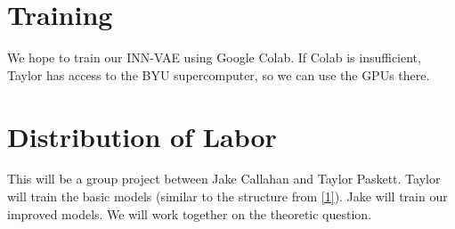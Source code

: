 \documentclass[11pt,letterpaper]{article}
\begin{document}
\section{Training}
We hope to train our INN-VAE using Google Colab.
If Colab is insufficient, Taylor has access to the BYU supercomputer, so we can use the GPUs there.

\section{Distribution of Labor}
This will be a group project between Jake Callahan and Taylor Paskett.
Taylor will train the basic models (similar to the structure from \href{https://doi.org/10.1007/978-3-030-33676-9_31}{[1]}).
Jake will train our improved models.
We will work together on the theoretic question.
\end{document}
